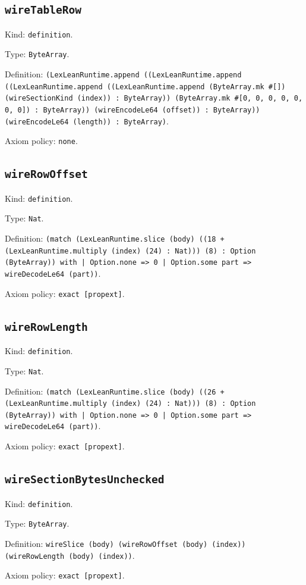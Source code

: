 \documentclass[11pt]{article}
\begin{document}
\subsection*{\texttt{wireTableRow}}
\noindent Kind: \texttt{definition}.\par
\noindent Type: \texttt{ByteArray}.\par
\noindent Definition: \texttt{(LexLeanRuntime.append ((LexLeanRuntime.append ((LexLeanRuntime.append ((LexLeanRuntime.append (ByteArray.mk \#[]) (wireSectionKind (index)) : ByteArray)) (ByteArray.mk \#[0, 0, 0, 0, 0, 0, 0]) : ByteArray)) (wireEncodeLe64 (offset)) : ByteArray)) (wireEncodeLe64 (length)) : ByteArray)}.\par
\noindent Axiom policy: \texttt{none}.\par
\subsection*{\texttt{wireRowOffset}}
\noindent Kind: \texttt{definition}.\par
\noindent Type: \texttt{Nat}.\par
\noindent Definition: \texttt{(match (LexLeanRuntime.slice (body) ((18 + (LexLeanRuntime.multiply (index) (24) : Nat))) (8) : Option (ByteArray)) with | Option.none => 0 | Option.some part => wireDecodeLe64 (part))}.\par
\noindent Axiom policy: \texttt{exact [propext]}.\par
\subsection*{\texttt{wireRowLength}}
\noindent Kind: \texttt{definition}.\par
\noindent Type: \texttt{Nat}.\par
\noindent Definition: \texttt{(match (LexLeanRuntime.slice (body) ((26 + (LexLeanRuntime.multiply (index) (24) : Nat))) (8) : Option (ByteArray)) with | Option.none => 0 | Option.some part => wireDecodeLe64 (part))}.\par
\noindent Axiom policy: \texttt{exact [propext]}.\par
\subsection*{\texttt{wireSectionBytesUnchecked}}
\noindent Kind: \texttt{definition}.\par
\noindent Type: \texttt{ByteArray}.\par
\noindent Definition: \texttt{wireSlice (body) (wireRowOffset (body) (index)) (wireRowLength (body) (index))}.\par
\noindent Axiom policy: \texttt{exact [propext]}.\par
\end{document}
